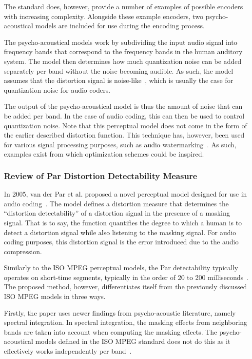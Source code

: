 The standard does, however, provide a number of examples of possible encoders with increasing complexity.
Alongside these example encoders, two psycho-acoustical models are included for use during the encoding process. 

The psycho-acoustical models work by subdividing the input audio signal into frequency bands that correspond to the frequency bands in the human auditory system.
The model then determines how much quantization noise can be added separately per band without the noise becoming audible.
As such, the model assumes that the distortion signal is noise-like~\cite{van2005perceptual}, which is usually
the case for quantization noise for audio coders.

The output of the psycho-acoustical model is thus the amount of noise that can be added per band.
In the case of audio coding, this can then be used to control quantization noise.
Note that this perceptual model does not come in the form of the earlier described distortion function.
This technique has, however, been used for various signal processing purposes, such as audio watermarking~\cite{taal2012low}.
As such, examples exist from which optimization schemes could be inspired.

\subsubsection{Review of Par Distortion Detectability Measure}
In 2005, van der Par et al. proposed a novel perceptual model designed for use in audio coding~\cite{van2005perceptual}.
The model defines a distortion measure that determines the ``distortion detectability'' of a distortion signal in the presence of a masking signal.
That is to say, the function quantifies the degree to which a human is to detect a distortion signal while also listening to the masking signal.
For audio coding purposes, this distortion signal is the error introduced due to the audio compression.

Similarly to the ISO MPEG perceptual models, the Par detectability typically operates on short-time segments, 
typically in the order of 20 to 200 milliseconds~\cite{van2005perceptual}.
The proposed method, however, differentiates itself from the previously discussed ISO MPEG models in three ways.

Firstly, the paper uses newer findings from psycho-acoustic literature, namely spectral integration.
In spectral integration, the masking effects from neighboring bands are taken into account when computing the masking effects.
The psycho-acoustical models defined in the ISO MPEG standard does not do this as it effectively 
works independently per band~\cite{taal2012low}.

